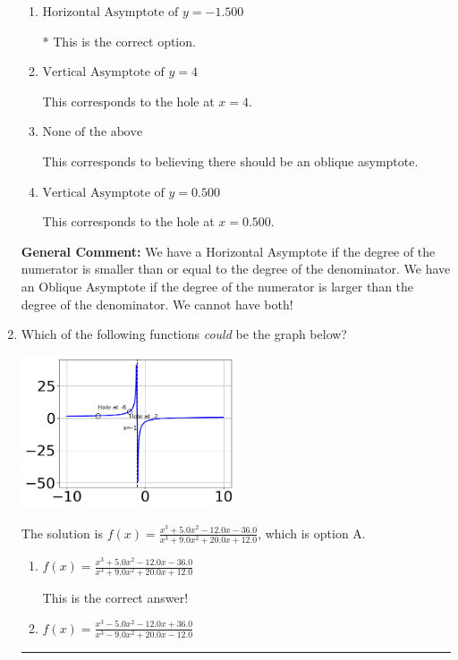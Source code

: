 \documentclass{extbook}[14pt]
\newcommand{\litem}[1]{\item #1

\rule{\textwidth}{0.4pt}}
\begin{document}
\begin{enumerate}
{\begin{enumerate}[label=\Alph*.]
This corresponds to using the rule for Horizontal Asymptote when the degree of the denominator is larger than the numerator.
\item \( \text{Horizontal Asymptote of } y = -1.500  \)

* This is the correct option.
\item \( \text{Vertical Asymptote of } y = 4  \)

This corresponds to the hole at $x = 4$.
\item \( \text{None of the above} \)

This corresponds to believing there should be an oblique asymptote.
\item \( \text{Vertical Asymptote of } y = 0.500  \)

This corresponds to the hole at $x = 0.500$.
\end{enumerate}

\textbf{General Comment:} We have a Horizontal Asymptote if the degree of the numerator is smaller than or equal to the degree of the denominator. We have an Oblique Asymptote if the degree of the numerator is larger than the degree of the denominator. We cannot have both!
}
\litem{
Which of the following functions \textit{could} be the graph below?

\begin{center}
    \includegraphics[width=0.5\textwidth]{../Figures/identifyGraphOfRationalFunctionC.png}
\end{center}


The solution is \( f(x)=\frac{x^{3} +5.0 x^{2} -12.0 x -36.0}{x^{3} +9.0 x^{2} +20.0 x + 12.0} \), which is option A.\begin{enumerate}[label=\Alph*.]
\item \( f(x)=\frac{x^{3} +5.0 x^{2} -12.0 x -36.0}{x^{3} +9.0 x^{2} +20.0 x + 12.0} \)

This is the correct answer!
\item \( f(x)=\frac{x^{3} -5.0 x^{2} -12.0 x + 36.0}{x^{3} -9.0 x^{2} +20.0 x -12.0} \)


\end{enumerate}}
\end{enumerate}
\end{document}
